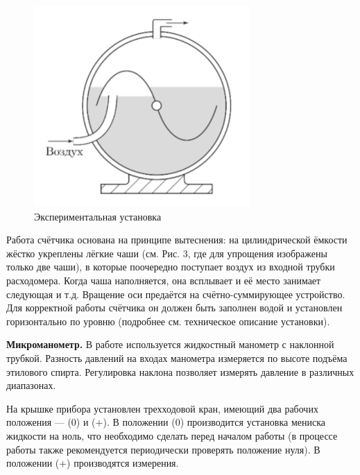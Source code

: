 \documentclass[a4paper, 10pt, twocolumn]{article}
\begin{document}
    \begin{figure}[H]
        \includegraphics[width=1\linewidth]{images/gasCounter.png}
        \begin{center}
            \caption{Экспериментальная установка}
        \end{center}
    \end{figure}


    Работа счётчика основана на принципе вытеснения: на цилиндрической ёмкости жёстко
    укреплены лёгкие чаши (см. Рис. 3, где для
    упрощения изображены только две чаши), в которые поочередно поступает воздух из входной
    трубки расходомера. Когда чаша наполняется,
    она всплывает и её место занимает следующая
    и т.д. Вращение оси предаётся на счётно-суммирующее устройство.
    Для корректной работы счётчика он должен
    быть заполнен водой и установлен горизонтально по уровню (подробнее см. техническое
    описание установки).

    \textbf{Микроманометр.} В работе используется жидкостный манометр с наклонной трубкой. Разность давлений на входах манометра измеряется по высоте
    подъёма этилового спирта. Регулировка
    наклона позволяет измерять давление в различных диапазонах.

    На крышке прибора установлен трехходовой кран, имеющий два рабочих
    положения — (0) и (+). В положении (0) производится установка мениска жидкости на ноль, что необходимо сделать перед началом работы (в процессе работы также рекомендуется периодически проверять положение нуля). В положении (+) производятся измерения.
\end{document}
